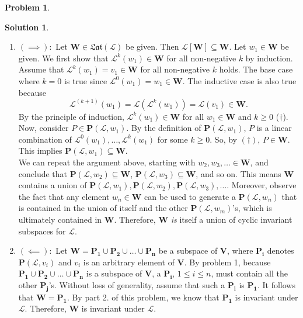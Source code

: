 \documentclass{book}
\theoremstyle{definition}
\newtheorem*{prob*}{Problem}
\newtheorem*{sln*}{Solution}
\newcommand{\V}{\mathbf{V}}
\newcommand{\W}{\mathbf{W}}
\newcommand{\lag}{\mathcal{L}}
\begin{document}
\begin{prob*}
\begin{sln*}
\begin{enumerate}
\begin{enumerate}
			\item $(\implies):$ Let $\W \in \mathfrak{Lat}(\lag)$ be given. Then $\lag[\W] \subseteq \W$. Let $w_1 \in \W$ be given. We first show that $\lag^k(w_1) \in \W$ for all non-negative $k$ by induction. Assume that $\lag^k(w_1) = v_1 \in \W$ for all non-negative $k$ holds. The base case where $k=0$ is true since $\lag^0(w_1) = w_1\in\W$. The inductive case is also true because $$\lag^{(k+1)}(w_1) = \lag(\lag^k(w_1)) = \lag(v_1) \in \W.$$ By the principle of induction, $\lag^k(w_1) \in \W$ for all $w_1\in\W$ and $k\geq 0$ ($\dagger$). Now, consider $P \in \mathbf{P}(\lag,w_1)$. By the definition of $\mathbf{P}(\lag,w_1)$, $P$ is a linear combination of $\lag^0(w_1),\dots,\lag^k(w_1)$ for some $k\geq 0$. So, by $(\dagger)$, $P \in \W$. This implies $\mathbf{P}(\lag,w_1) \subseteq \W$. \\
			
			We can repeat the argument above, starting with $w_2,w_3,\dots \in \W$, and conclude that $\mathbf{P}(\lag,w_2) \subseteq \W$, $\mathbf{P}(\lag,w_3) \subseteq \W$, and so on. This means $\W$ contains a union of $\mathbf{P}(\lag,w_1), \mathbf{P}(\lag,w_2), \mathbf{P}(\lag,w_3), \dots$. Moreover, observe the fact that any element $w_n \in \W$ can be used to generate a $\mathbf{P}(\lag,w_n)$ that is contained in the union of itself and the other $\mathbf{P}(\lag,w_m)$'s, which is ultimately contained in $\W$. Therefore, $\W$ \textit{is} itself a union of cyclic invariant subspaces for $\lag$.\\  
			
			
			\item $(\impliedby):$ Let $\W = \mathbf{P_1} \cup \mathbf{P_2} \cup \dots \cup \mathbf{P_n}$ be a subspace of $\V$, where $\mathbf{P_i}$ denotes $\mathbf{P}(\lag,v_i)$ and $v_i$ is an arbitrary element of $\V$. By problem 1, because $\mathbf{P_1} \cup \mathbf{P_2} \cup \dots \cup \mathbf{P_n}$ is a subspace of $\V$, a $\mathbf{P_i}$, $1\leq i \leq n$, must contain all the other $\mathbf{P_j}$'s. Without loss of generality, assume that such a $\mathbf{P_i}$ is $\mathbf{P_1}$. It follows that $\W = \mathbf{P_1}$. By part 2. of this problem, we know that $\mathbf{P_1}$ is invariant under $\lag$. Therefore, $\W$ is invariant under $\lag$.
			
			 
			\end{enumerate} 
			
		\end{enumerate}
	\end{sln*}
\end{prob*}
\end{document}
